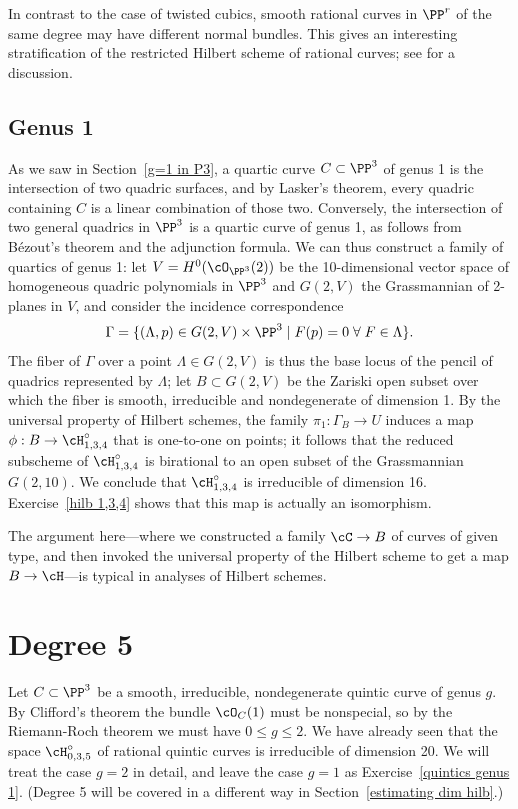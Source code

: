 In contrast to the case of twisted cubics, smooth rational curves in $\PP^r$ of the same degree may have different normal bundles. This gives an interesting stratification of the restricted Hilbert scheme of rational curves; see \cite{MR3778979} for a discussion.

\subsection{Genus 1}
 As we saw in Section~\ref{g=1 in P3}, a quartic curve $C \subset \PP^3$ of genus 1 is the intersection of two quadric surfaces, and by Lasker's theorem, every quadric containing $C$ is a linear combination of those two. Conversely, the intersection of two general quadrics in $\PP^3$ is a quartic curve of genus 1, as follows from B\'ezout's theorem and the adjunction formula. We can thus construct a family of quartics of genus 1: let $V = H^0(\cO_{\PP^3}(2))$ be the 10-dimensional vector space of homogeneous quadric polynomials in $\PP^3$ and $G(2,V)$ the Grassmannian of 2-planes in $V$, and consider the incidence correspondence
$$
\Gamma = \{ (\Lambda, p) \in G(2,V) \times \PP^3 \mid F(p)=0 \; \forall \; F \in \Lambda \}.
$$
The fiber of $\Gamma$ over a point $\Lambda \in G(2,V)$ is thus the base locus of the pencil of quadrics represented by $\Lambda$; let $B \subset G(2,V)$ be the Zariski open subset over which the fiber is smooth, irreducible and nondegenerate of dimension 1. By the universal property of Hilbert schemes, the family $\pi_1 : \Gamma_B \to U$ induces a map $\phi : B \to \cH^\circ_{1,3,4}$ that is one-to-one on points; it follows that the reduced subscheme of $\cH^\circ_{1,3,4}$ is birational to an open subset of the Grassmannian $G(2,10)$. We conclude that $\cH^\circ_{1,3,4}$ is irreducible of dimension 16. Exercise~\ref{hilb 1,3,4} shows that this map is actually an isomorphism.

The  argument  here---where we constructed a family $\cC \to B$ of curves of given type, and then invoked the universal property of the Hilbert scheme to get a map $B \to \cH$---is typical in analyses of Hilbert schemes. 

\section{Degree 5}

Let $C \subset \PP^3$ be a smooth, irreducible, nondegenerate quintic curve of genus $g$. By Clifford's theorem the bundle $\cO_C(1)$ must be nonspecial, so  by the Riemann-Roch theorem we must have $0\leq g \leq 2$. We have already seen that the space $\cH^\circ_{0,3,5}$ of rational quintic curves is irreducible of dimension 20. We will treat the case $g=2$ in detail, and leave the case $g=1$ as Exercise~\ref{quintics genus 1}. (Degree 5 will be covered in a different way in Section~\ref{estimating dim hilb}.)


